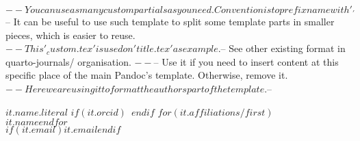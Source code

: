 $-- You can use as many custom partials as you need. Convention is to prefix name with '_'
$-- It can be useful to use such template to split some template parts in smaller pieces, which is easier to reuse. 
$-- This '_custom.tex' is used on 'title.tex' as example.
$-- See other existing format in quarto-journals/ organisation.
$-- %
$-- Use it if you need to insert content at this specific place of the main Pandoc's template. Otherwise, remove it.
$-- Here we are using it to format the authors part of the template.
$-- %

$it.name.literal$
$if(it.orcid)$~$endif$
$for(it.affiliations/first)$\\$it.name$$endfor$\\
$if(it.email)$\href{mailto:$it.email$}{$it.email$}$endif$